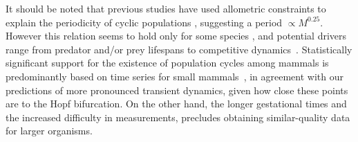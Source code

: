 \documentclass{pnastwo}
\begin{document}
\begin{article}
It should be noted that previous studies have used allometric constraints to explain the periodicity of cyclic populations \cite{CalderIII:1983jd,Peterson:1984hj,Krukonis:1991fk}, suggesting a period $\propto M^{0.25}$.
However this relation seems to hold only for some species \cite{Hendriks:2012fc}, and potential drivers range from predator and/or prey lifespans to competitive dynamics~\cite{Kendall:1999iy,Hogstedt:2005cr}.
Statistically significant support for the existence of population cycles among mammals is predominantly based on time series for small mammals~\cite{Kendall:1998hl}, in agreement with our predictions of more pronounced transient dynamics, given how close these points are to the Hopf bifurcation.
On the other hand, the longer gestational times and the increased difficulty in measurements, precludes obtaining similar-quality data for larger organisms.
\vspace{6mm}


\end{article}
\end{document}
